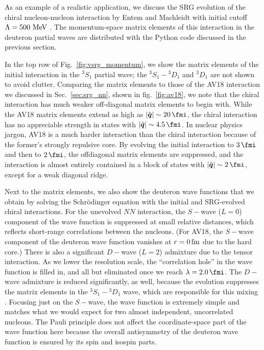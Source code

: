 As an example of a realistic application, we discuss the SRG evolution of the
chiral \NNNLO{} nucleon-nucleon interaction by Entem and Machleidt with initial 
cutoff $\Lambda=500\,\,\text{MeV}$ \cite{Entem:2003th,Machleidt:2011bh}. The momentum-space
matrix elements of this interaction in the deuteron partial waves are distributed
with the Python code discussed in the previous section.

In the top row of Fig.~\ref{fig:vsrg_momentum}, we show the matrix elements
of the initial interaction in the ${}^3S_1$ partial wave; the ${}^3S_1-{}^3D_1$
and ${}^3D_1$ are not shown to avoid clutter. Comparing the matrix elements to
those of the AV18 interaction we discussed in Sec.~\ref{sec:srg_nn}, shown
in fig.~\ref{fig:av18}, we note that the chiral interaction has much weaker
off-diagonal matrix elements to begin with. While the AV18 matrix elements
extend as high as $|\qOV|\sim 20\,\fmi$, the chiral interaction has no appreciable
strength in states with $|\qOV|\sim 4.5\,\fmi$. In nuclear physics jargon, 
AV18 is a much harder interaction than the chiral interaction because of 
the former's strongly repulsive core. By evolving the initial interaction
to $3\,\fmi$ and then to $2\,\fmi$, the offdiagonal matrix elements are 
suppressed, and the interaction is almost entirely contained in a block
of states with $|\qOV|\sim 2\,\fmi$, except for a weak diagonal ridge.

Next to the matrix elements, we also show the deuteron wave functions
that we obtain by solving the Schr\"odinger equation with the initial
and SRG-evolved chiral interactions. For the unevolved $NN$ interaction,
the $S-$wave ($L=0$) component of the wave function is 
suppressed at small relative distances, which reflects short-range 
correlations between the nucleons. (For AV18, the $S-$wave component of 
the deuteron wave function vanishes at $r=0\,\mathrm{fm}$ due to the hard core.)
There is also a significant $D-$wave ($L=2$) admixture due to the tensor interaction.
As we lower the resolution scale, the ``correlation hole'' in the wave
function is filled in, and all but eliminated once we reach 
$\lambdaSRG=2.0\,\fmi$. The $D-$wave admixture is reduced significantly,
as well, because the evolution suppresses the 
matrix elements in the ${}^3S_1-{}^3D_1$ wave, which are responsible
for this mixing \cite{Bogner:2010pq}. Focusing just on the $S-$wave,
the wave function is extremely simple and matches what we would expect
for two almost independent, uncorrelated nucleons. The Pauli principle
does not affect the coordinate-space part of the wave function here 
because the overall antisymmetry of the deuteron wave function is ensured 
by its spin and isospin parts.

